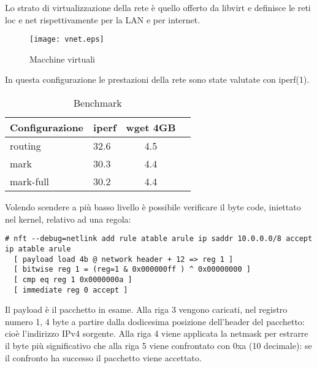 Lo strato di virtualizzazione della rete \`e quello offerto da libvirt e
definisce le reti loc e net rispettivamente per la LAN e per internet.
\begin{figure}[H]
\begin{center}
      \texttt{[image: vnet.eps]}
      \caption{Macchine virtuali}
      \label{fig:vnet}
\end{center}
\end{figure}
In questa configurazione le prestazioni della rete sono state valutate con iperf(1).
\begin{center}
  \label{tab:benchmark}
  \begin{table}[ht]
    \centering %
     \begin{tabular}{@{}llcc@{}}
     \toprule
     {\bf Configurazione} & {\bf iperf} & {\bf wget 4GB} \\ \midrule
         routing  & 32.6                & 4.5 \\
         mark     & 30.3                & 4.4 \\ 
         mark-full& 30.2                & 4.4 \\ \bottomrule
      \end{tabular}  
    \caption{Benchmark} %
  \end{table}
\end{center}
Volendo scendere a pi\`u basso livello \`e possibile verificare il byte code,
iniettato nel kernel, relativo ad una regola:
\begin{lstlisting}[style=customc]
# nft --debug=netlink add rule atable arule ip saddr 10.0.0.0/8 accept            
ip atable arule
  [ payload load 4b @ network header + 12 => reg 1 ]
  [ bitwise reg 1 = (reg=1 & 0x000000ff ) ^ 0x00000000 ]
  [ cmp eq reg 1 0x0000000a ]
  [ immediate reg 0 accept ]
\end{lstlisting}
Il payload \`e il pacchetto in esame. Alla riga 3 vengono caricati, nel
registro numero 1, 4 byte a partire dalla dodicesima posizione dell'header del
pacchetto: cio\`e l'indirizzo IPv4 sorgente. Alla riga 4 viene applicata la
netmask per estrarre il byte pi\`u significativo che alla riga 5 viene
confrontato con 0xa (10 decimale): se il confronto ha successo il pacchetto
viene accettato.
